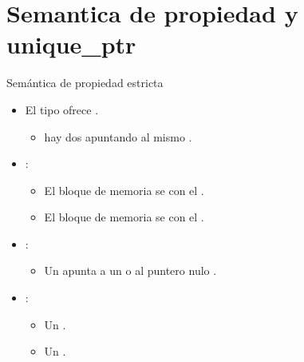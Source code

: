 \section{Semantica de propiedad y \textbf{unique\_ptr}}

\begin{frame}[t]{Semántica de propiedad estricta}
\begin{itemize}
  \item El tipo  ofrece .
    \begin{itemize}
      \item {} hay dos  apuntando al mismo 
            .
    \end{itemize}

  \item {}:
    \begin{itemize}
      \item El bloque de memoria se  con el .
      \item El bloque de memoria se  con el .
    \end{itemize}

  \item {}:
    \begin{itemize}
      \item Un  apunta a un 
            o al puntero nulo .
    \end{itemize}

  \item {}:
    \begin{itemize}
      \item Un  .
      \item Un  .
    \end{itemize}
\end{itemize}
\end{frame}

